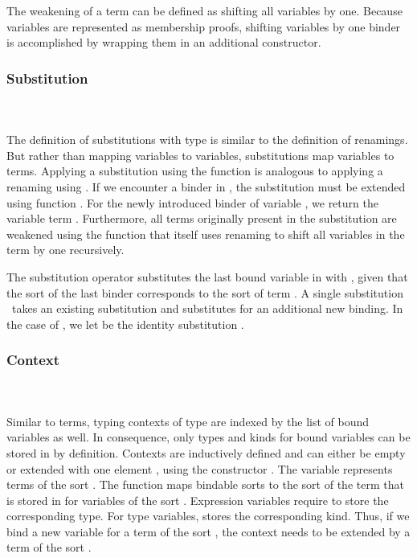 \noindent The weakening of a term can be defined as shifting all variables by one.
\Fwk 
Because variables are represented as membership proofs, shifting variables by one binder is accomplished by wrapping them in an additional  constructor.

\subsubsection{Substitution}\hfill\\\\
The definition of substitutions  with type    is similar to the definition of renamings. But rather than mapping variables to variables, substitutions map variables to terms.
\FSub
Applying a substitution using the  function is analogous to applying a renaming using . If we encounter a binder in , the substitution must be extended using function .
\Fext
For the newly introduced binder of variable , we return the variable term .  
Furthermore, all terms originally present in the substitution  are weakened using the function  that itself uses renaming to shift all variables in the term by one recursively.

\noindent The substitution operator  \Data{[}  \Data{]} substitutes the last bound variable in  with , given that the sort of the last binder corresponds to the sort of term .
\Fsubs
A single substitution \Fsinglesub\ takes an existing substitution  and substitutes  for an additional new binding. In the case of \Data{\_[\_]}, we let  be the identity substitution \Fidsub.

\subsubsection{Context}\hfill\\\\
Similar to terms, typing contexts  of type   are indexed by the list of bound variables as well. In consequence, only types and kinds for bound variables can be stored in  by definition.
\FCtx
Contexts are inductively defined and can either be empty  or extended with one element , using the constructor   . The variable  represents terms of the sort  . 
\noindent The function  maps bindable sorts  to the sort of the term that is stored in  for variables of the sort .
\Fkind
Expression variables require  to store the corresponding type. 
For type variables,  stores the corresponding kind. Thus, if we bind a new variable for a term of the sort , the context  needs to be extended by a term of the sort  .

